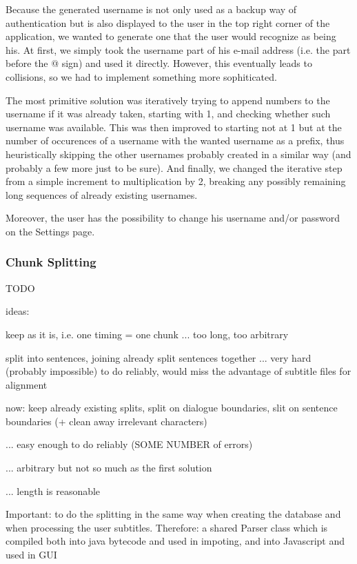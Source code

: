 Because the generated username is not only used as a backup way of authentication but is also displayed to the user in the top right corner of the application, we wanted to generate one that the user would recognize as being his. At first, we simply took the username part of his e-mail address (i.e. the part before the @ sign) and used it directly. However, this eventually leads to collisions, so we had to implement something more sophiticated.

The most primitive solution was iteratively trying to append numbers to the username if it was already taken, starting with 1, and checking whether such username was available. This was then improved to starting not at 1 but at the number of occurences of a username with the wanted username as a prefix, thus heuristically skipping the other usernames probably created in a similar way (and probably a few more just to be sure). And finally, we changed the iterative step from a simple increment to multiplication by 2, breaking any possibly remaining long sequences of already existing usernames.

Moreover, the user has the possibility to change his username and/or password on the Settings page.

\subsubsection{Chunk Splitting}

TODO

ideas:

keep as it is, i.e. one timing = one chunk ... too long, too arbitrary

split into sentences, joining already split sentences together ... very hard (probably impossible) to do reliably, would miss the advantage of subtitle files for alignment

now: keep already existing splits, split on dialogue boundaries, slit on sentence boundaries (+ clean away irrelevant characters)

... easy enough to do reliably (SOME NUMBER of errors)

... arbitrary but not so much as the first solution

... length is reasonable

Important: to do the splitting in the same way when creating the database and when processing the user subtitles.
Therefore: a shared Parser class which is compiled both into java bytecode and used in impoting, and into Javascript and used in GUI

